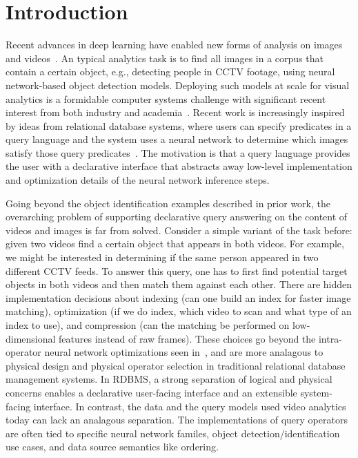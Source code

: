 \section{Introduction}\label{intro}\sloppy
Recent advances in deep learning have enabled new forms of analysis on images and videos~\cite{lecun2015deep}. 
An typical analytics task is to find all images in a corpus that contain a certain object, e.g., detecting people in CCTV footage, using neural network-based object detection models.  
Deploying such models at scale for visual analytics is a formidable computer systems challenge with significant recent interest from both industry and academia~\cite{kang2017noscope, anderson2018predicate, kang2018blazeit, chetlur2014cudnn}. 
Recent work is increasingly inspired by ideas from relational database systems, where users can specify predicates in a query language and the system uses a neural network to determine which images satisfy those query predicates~\cite{kang2018blazeit,wu2018querying}.
The motivation is that a query language provides the user with a declarative interface that abstracts away low-level implementation and optimization details of the neural network inference steps.

Going beyond the object identification examples described in prior work, the overarching problem of supporting declarative query answering on the content of videos and images is far from solved. 
Consider a simple variant of the task before: given two videos find a certain object that appears in both videos. For example, we might be interested in determining if the same person appeared in two different CCTV feeds. To answer this query, one has to first find potential target objects in both videos and then match them against each other. There are hidden implementation decisions about indexing (can one build an index for faster image matching), optimization (if we do index, which video to scan and what type of an index to use), and compression (can the matching be performed on low-dimensional features instead of raw frames). These choices go beyond the intra-operator neural network optimizations seen in~\cite{kang2017noscope, anderson2018predicate, kang2018blazeit}, and are more analagous to physical design and physical operator selection in traditional relational database management systems. In RDBMS, a strong separation of logical and physical concerns enables a declarative user-facing interface and an extensible system-facing interface. In contrast, the data and the query models used video analytics today can lack an analagous separation. The implementations of query operators are often tied to specific neural network familes, object detection/identification use cases, and data source semantics like ordering.


